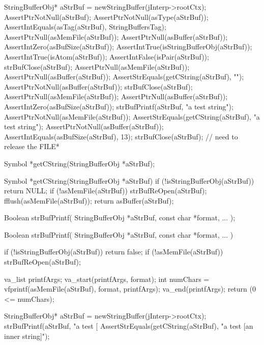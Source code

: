   StringBufferObj* aStrBuf = newStringBuffer(jInterp->rootCtx);
  AssertPtrNotNull(aStrBuf);
  AssertPtrNotNull(asType(aStrBuf));
  AssertIntEquals(asTag(aStrBuf), StringBuffersTag);
  AssertPtrNull(asMemFile(aStrBuf));
  AssertPtrNull(asBuffer(aStrBuf));
  AssertIntZero(asBufSize(aStrBuf));
  AssertIntTrue(isStringBufferObj(aStrBuf));
  AssertIntTrue(isAtom(aStrBuf));
  AssertIntFalse(isPair(aStrBuf));
  strBufClose(aStrBuf);
  AssertPtrNull(asMemFile(aStrBuf));
  AssertPtrNull(asBuffer(aStrBuf));
  AssertStrEquals(getCString(aStrBuf), "");
  AssertPtrNotNull(asBuffer(aStrBuf));
  strBufClose(aStrBuf);
  AssertPtrNull(asMemFile(aStrBuf));
  AssertPtrNull(asBuffer(aStrBuf));
  AssertIntZero(asBufSize(aStrBuf));
  strBufPrintf(aStrBuf, "a test string");
  AssertPtrNotNull(asMemFile(aStrBuf));
  AssertStrEquals(getCString(aStrBuf), "a test string");
  AssertPtrNotNull(asBuffer(aStrBuf));
  AssertIntEquals(asBufSize(aStrBuf), 13);
  strBufClose(aStrBuf); // need to release the FILE*
\stopCTest
\skipTestCase
\stopTestSuite



\startCHeader
Symbol *getCString(StringBufferObj *aStrBuf);
\stopCHeader

\startCCode
Symbol *getCString(StringBufferObj *aStrBuf) {
  if (!isStringBufferObj(aStrBuf)) return NULL;
  if (!asMemFile(aStrBuf)) strBufReOpen(aStrBuf);
  fflush(asMemFile(aStrBuf));
  return asBuffer(aStrBuf);
}
\stopCCode

\stopTestSuite

\startTestSuite[strBufPrintf]

\startCHeader
Boolean strBufPrintf(
  StringBufferObj   *aStrBuf,
  const char        *format, 
  ...
);
\stopCHeader

\startCCode
Boolean strBufPrintf(
  StringBufferObj   *aStrBuf,
  const char        *format,
  ...
) {
  if (!isStringBufferObj(aStrBuf)) return false;
  if (!asMemFile(aStrBuf)) strBufReOpen(aStrBuf);
  
  va_list printfArgs;
  va_start(printfArgs, format);
  int numChars = vfprintf(asMemFile(aStrBuf), format, printfArgs);
  va_end(printfArgs);
  return (0 <= numChars);
}
\stopCCode

\startCTest
  StringBufferObj* aStrBuf = newStringBuffer(jInterp->rootCtx);
  strBufPrintf(aStrBuf, "a test [%
  AssertStrEquals(getCString(aStrBuf), "a test [an inner string]");
\stopCTest
\skipTestCase
\stopTestSuite

